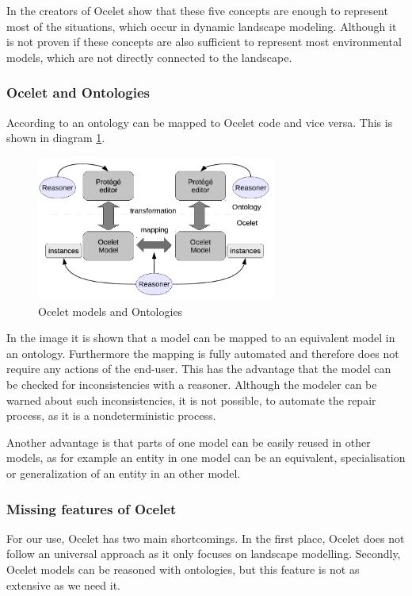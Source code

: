 \par
In \autocite{dsl:ocelet-design} the creators of Ocelet show that these five concepts are enough to represent most of the situations, which occur in dynamic landscape modeling. Although it is not proven if these concepts are also sufficient to represent most environmental models, which are not directly connected to the landscape.

\subsubsection{Ocelet and Ontologies}
\par
According to \autocite{dsl:ocelet-design} an ontology can be mapped to Ocelet code and vice versa. This is shown in diagram \ref{fig:ocelet_and_ontologies}.
\begin{figure}[h]
	\centering
	\includegraphics[width=0.7\textwidth]{pics/ocelet/ocelet_and_ontologies.png}
	\caption{Ocelet models and Ontologies  \label{fig:ocelet_and_ontologies}}	
\end{figure}
\par
In the image it is shown that a model can be mapped to an equivalent model in an ontology. Furthermore the mapping is fully automated and therefore does not require any actions of the end-user. This has the advantage that the model can be checked for inconsistencies with a reasoner. Although the modeler can be warned about such inconsistencies, it is not possible, to automate the repair process, as it is a nondeterministic process.  
\par
Another advantage is that parts of one model can be easily reused in other models, as for example an entity in one model can be an equivalent, specialisation or generalization of an entity in an other model.

\subsubsection{Missing features of Ocelet}
\par
For our use, Ocelet has two main shortcomings. In the first place, Ocelet does not follow an universal approach as it only focuses on landscape modelling. Secondly, Ocelet models can be reasoned with ontologies, but this feature is not as extensive as we need it.

